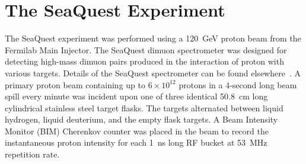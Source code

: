 \documentclass[reprint,aps,unsortedaddress,superscriptaddress,prl,floatfix,showpacs,linenumbers]{revtex4-2}
\begin{document}

\section{The SeaQuest Experiment}

The SeaQuest experiment was performed using a \SI{120}{\GeV} proton beam from the
Fermilab Main Injector. The SeaQuest dimuon spectrometer was designed for
detecting high-mass dimuon pairs produced in the interaction of proton
with various targets. Details of the SeaQuest spectrometer can be found
elsewhere~\cite{aidala2019,dove2021,dove2023}. A primary proton beam containing
up to $6 \times 10^{12}$ protons in a 4-second long beam spill every minute
was incident upon one of three identical \SI{50.8}{\cm} long cylindrical
stainless steel
target flasks. The targets alternated between liquid hydrogen, liquid deuterium,
and the empty flask targets. A Beam Intensity Monitor (BIM) Cherenkov counter
was placed in the beam to record the instantaneous proton intensity for
each \SI{1}{\ns} long RF bucket at \SI{53}{\MHz} repetition rate.
\end{document}
